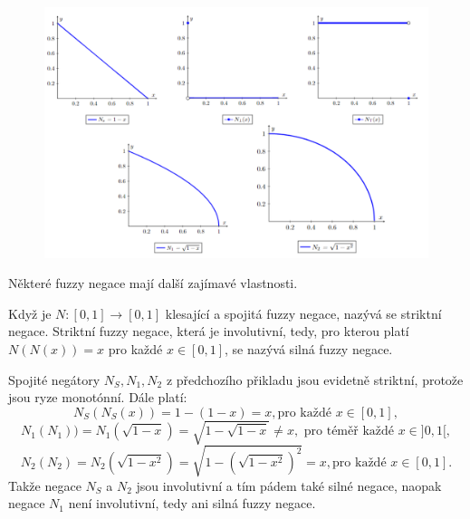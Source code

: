 \begin{example}
\begin{graph}
            \begin{figure}[h]
                \includegraphics[scale=0.56]{template-fig/negace.pdf}
                \centering
            \end{figure}
        \end{graph}
    \end{example}

   N\v ekter\'e fuzzy negace maj\'i dal\v s\'i zaj\'imav\'e vlastnosti. 

    \begin{definition}
    \cite{Kolo}
        Kdy\v z je $N: [0,1] \to [0,1]$ klesající a spojitá fuzzy negace, nazývá se striktní negace.
        Striktn\'i fuzzy negace, kter\'a je involutivní, tedy, pro kterou plat\'i $N(N(x)) = x $ pro každé $ x \in [0,1]$, se nazývá silná fuzzy negace.
    \end{definition}

    \begin{example}
        Spojit\'e neg\'atory $N_S, N_1, N_2$ z p\v redchoz\'iho p\v rikladu jsou evidetn\v e striktn\'i, proto\v ze jsou ryze monot\'onn\'i. D\'ale plat\'i:
        $$N_S(N_S(x))=1-(1-x)=x, \mbox{pro ka\v zd\'e } x \in [0,1],$$
                $$N_1(N_1)) = N_1(\sqrt{1-x}) = \sqrt{1-\sqrt{1-x}} \neq x, \mbox{ pro t\'em\v e\v r každé } x \in ]0,1[,$$ $$N_2(N_2) = N_2(\sqrt{1-x^2}) = \sqrt{1-(\sqrt{1-x^2})^2} = x,
                \mbox{pro každé } x \in [0,1].$$
Takže negace $N_S$ a $N_2$ jsou involutivní a tím pádem tak\'e siln\'e negace, naopak
            negace $N_1$ není involutivní, tedy ani siln\'a fuzzy negace.
                
            \end{example}

